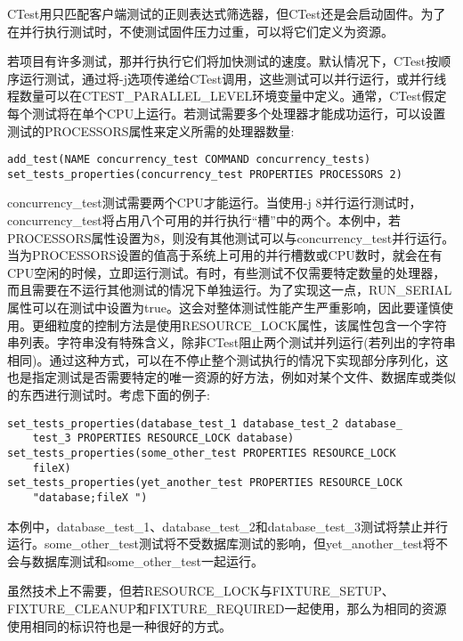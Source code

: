 CTest用只匹配客户端测试的正则表达式筛选器，但CTest还是会启动固件。为了在并行执行测试时，不使测试固件压力过重，可以将它们定义为资源。


若项目有许多测试，那并行执行它们将加快测试的速度。默认情况下，CTest按顺序运行测试，通过将-j选项传递给CTest调用，这些测试可以并行运行，或并行线程数量可以在CTEST\_PARALLEL\_LEVEL环境变量中定义。通常，CTest假定每个测试将在单个CPU上运行。若测试需要多个处理器才能成功运行，可以设置测试的PROCESSORS属性来定义所需的处理器数量:

\begin{lstlisting}[style=styleCMake]
add_test(NAME concurrency_test COMMAND concurrency_tests)
set_tests_properties(concurrency_test PROPERTIES PROCESSORS 2)
\end{lstlisting}

concurrency\_test测试需要两个CPU才能运行。当使用-j 8并行运行测试时，concurrency\_test将占用八个可用的并行执行“槽”中的两个。本例中，若PROCESSORS属性设置为8，则没有其他测试可以与concurrency\_test并行运行。当为PROCESSORS设置的值高于系统上可用的并行槽数或CPU数时，就会在有CPU空闲的时候，立即运行测试。有时，有些测试不仅需要特定数量的处理器，而且需要在不运行其他测试的情况下单独运行。为了实现这一点，RUN\_SERIAL属性可以在测试中设置为true。这会对整体测试性能产生严重影响，因此要谨慎使用。更细粒度的控制方法是使用RESOURCE\_LOCK属性，该属性包含一个字符串列表。字符串没有特殊含义，除非CTest阻止两个测试并列运行(若列出的字符串相同)。通过这种方式，可以在不停止整个测试执行的情况下实现部分序列化，这也是指定测试是否需要特定的唯一资源的好方法，例如对某个文件、数据库或类似的东西进行测试时。考虑下面的例子:

\begin{lstlisting}[style=styleCMake]
set_tests_properties(database_test_1 database_test_2 database_
	test_3 PROPERTIES RESOURCE_LOCK database)
set_tests_properties(some_other_test PROPERTIES RESOURCE_LOCK
	fileX)
set_tests_properties(yet_another_test PROPERTIES RESOURCE_LOCK
	"database;fileX ")
\end{lstlisting}

本例中，database\_test\_1、database\_test\_2和database\_test\_3测试将禁止并行运行。some\_other\_test测试将不受数据库测试的影响，但yet\_another\_test将不会与数据库测试和some\_other\_test一起运行。

\begin{tcolorbox}[colback=blue!5!white,colframe=blue!75!black,title=固件为源]
虽然技术上不需要，但若RESOURCE\_LOCK与FIXTURE\_SETUP、FIXTURE\_CLEANUP和FIXTURE\_REQUIRED一起使用，那么为相同的资源使用相同的标识符也是一种很好的方式。
\end{tcolorbox}

